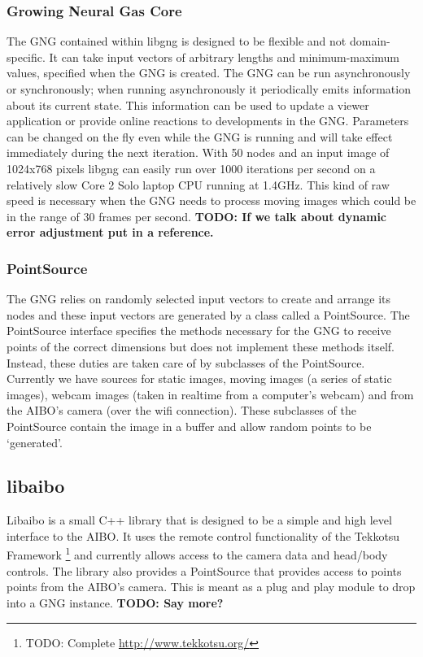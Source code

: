 \documentclass{article}
\renewcommand{\|}{\origbar} %
\begin{document}
\subsubsection{Growing Neural Gas Core}

The GNG contained within libgng is designed to be flexible and not domain-specific. It can take input vectors of arbitrary lengths and minimum-maximum values, specified when the GNG is created. The GNG can be run asynchronously or synchronously; when running asynchronously it periodically emits information about its current state. This information can be used to update a viewer application or provide online reactions to developments in the GNG. Parameters can be changed on the fly even while the GNG is running and will take effect immediately during the next iteration. With 50 nodes and an input image of 1024x768 pixels libgng can easily run over 1000 iterations per second on a relatively slow Core 2 Solo laptop CPU running at 1.4GHz. This kind of raw speed is necessary when the GNG needs to process moving images which could be in the range of 30 frames per second. {\bf TODO: If we talk about dynamic error adjustment put in a reference.}

\subsubsection{PointSource}

The GNG relies on randomly selected input vectors to create and arrange its nodes and these input vectors are generated by a class called a PointSource. The PointSource interface specifies the methods necessary for the GNG to receive points of the correct dimensions but does not implement these methods itself. Instead, these duties are taken care of by subclasses of the PointSource. Currently we have sources for static images, moving images (a series of static images), webcam images (taken in realtime from a computer's webcam) and from the AIBO's camera (over the wifi connection). These subclasses of the PointSource contain the image in a buffer and allow random points to be `generated'.

\subsection{libaibo}

Libaibo is a small C++ library that is designed to be a simple and high level interface to the AIBO. It uses the remote control functionality of the Tekkotsu Framework \footnote{TODO: Complete \url{http://www.tekkotsu.org/}} and currently allows access to the camera data and head/body controls. The library also provides a PointSource that provides access to points points from the AIBO's camera. This is meant as a plug and play module to drop into a GNG instance. {\bf TODO: Say more?}
\end{document}
